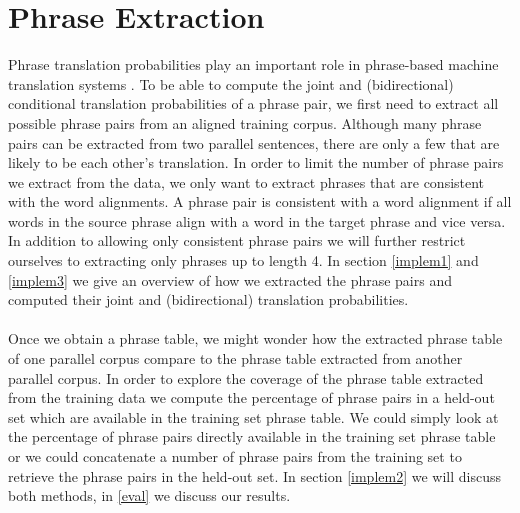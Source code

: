\documentclass[11pt]{article}
\begin{document}
\section{Phrase Extraction}
\label{problem}
Phrase translation probabilities play an important role in phrase-based machine translation systems \cite{koehn}. To be able to compute the joint and (bidirectional) conditional translation probabilities of a phrase pair, we first need to extract all possible phrase pairs from an aligned training corpus. Although many phrase pairs can be extracted from two parallel sentences, there are only a few that are likely to be each other's translation. In order to limit the number of phrase pairs we extract from the data, we only want to extract phrases that are consistent with the word alignments. A phrase pair is consistent with a word alignment if all words in the source phrase align with a word in the target phrase and vice versa.  In addition to allowing only consistent phrase pairs we will further restrict ourselves to extracting only phrases up to length 4. In section \ref{implem1} and \ref{implem3} we give an overview of how we extracted the phrase pairs and computed their joint and (bidirectional) translation probabilities.\\\\
Once we obtain a phrase table, we might wonder how the extracted phrase table of one parallel corpus compare to the phrase table extracted from another parallel corpus. In order to explore the coverage of the phrase table extracted from the training data we compute the percentage of phrase pairs in a held-out set which are available in the training set phrase table. We could simply look at the percentage of phrase pairs directly available in the training set phrase table or we could concatenate a number of phrase pairs from the training set to retrieve the phrase pairs in the held-out set. In section \ref{implem2} we will discuss both methods, in \ref{eval} we discuss our results.
\end{document}
